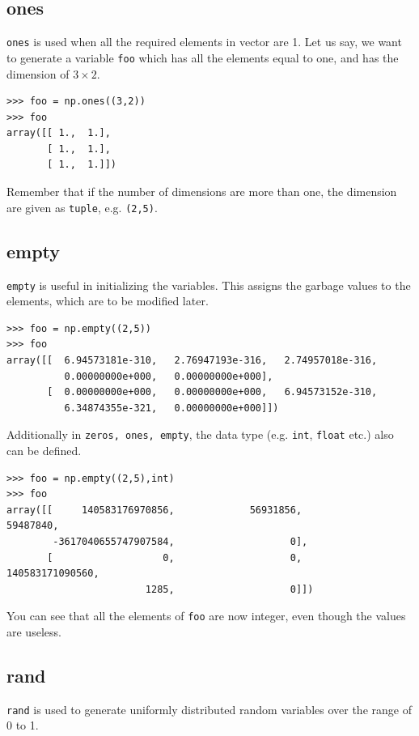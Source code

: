 \documentclass[10pt]{book}
\begin{document}
{\subsection{ones}
\verb"ones" is used when all the required elements in vector are 1. Let us say, we want to generate a variable \verb"foo" which has all the elements equal to one, and has the dimension of $3 \times 2$. 

\beforeverb
\begin{verbatim}
>>> foo = np.ones((3,2))
>>> foo
array([[ 1.,  1.],
       [ 1.,  1.],
       [ 1.,  1.]])
\end{verbatim}
\afterverb
Remember that if the number of dimensions are more than one, the dimension are given as \verb"tuple", e.g. \verb"(2,5)". 

\subsection{empty}
\verb"empty" is useful in initializing the variables. This assigns the garbage values to the elements, which are to be modified later. 
\beforeverb \begin{verbatim}
>>> foo = np.empty((2,5))
>>> foo
array([[  6.94573181e-310,   2.76947193e-316,   2.74957018e-316,
          0.00000000e+000,   0.00000000e+000],
       [  0.00000000e+000,   0.00000000e+000,   6.94573152e-310,
          6.34874355e-321,   0.00000000e+000]])
\end{verbatim}
\afterverb

Additionally in \verb"zeros, ones, empty", the data type (e.g. \verb"int", \verb"float" etc.) also can be defined.
\beforeverb \begin{verbatim}
>>> foo = np.empty((2,5),int)
>>> foo
array([[     140583176970856,             56931856,             59487840,
        -3617040655747907584,                    0],
       [                   0,                    0,      140583171090560,
                        1285,                    0]])
\end{verbatim} \afterverb
You can see that all the elements of \verb"foo" are now integer, even though the values are useless. 

\subsection{rand}
\verb"rand" is used to generate uniformly distributed random variables over the range of 0 to 1.

}
\end{document}
